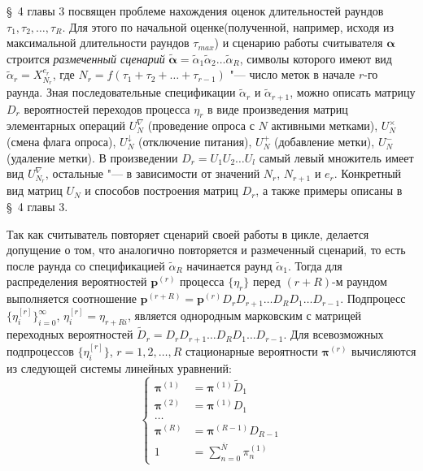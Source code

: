 \S~4 главы 3 посвящен проблеме нахождения оценок длительностей раундов $\tau_1, \tau_2, \dots, \tau_R$. Для этого по начальной оценке(полученной, например, исходя из максимальной длительности раундов $\tau_{max}$) и сценарию работы считывателя $\bm{\alpha}$ строится \textit{размеченный сценарий} $\widetilde{\bm{\alpha}} = \widetilde{\alpha}_1 \widetilde{\alpha}_2 \dots \widetilde{\alpha}_R$, символы которого имеют вид $\widetilde{\alpha}_r = X_{N_r}^{e_r}$, где $N_r = f(\tau_1 + \tau_2 + \dots + \tau_{r-1})$ "--- число меток в начале $r$-го раунда. Зная последовательные спецификации $\widetilde{\alpha}_{r}$ и $\widetilde{\alpha}_{r+1}$, можно описать матрицу $D_r$ вероятностей переходов процесса $\eta_r$ в виде произведения матриц элементарных операций $U_N^\nabla$ (проведение опроса с $N$ активными метками), $U_N^\times$ (смена флага опроса), $U_N^\downarrow$ (отключение питания), $U_N^+$ (добавление метки), $U_N^-$ (удаление метки). В произведении $D_r = U_1 U_2 \dots U_l$ самый левый множитель имеет вид $U_{N_r}^\nabla$, остальные "--- в зависимости от значений $N_r$, $N_{r+1}$ и $e_r$. Конкретный вид матриц $U_N$ и способов построения матриц $D_r$, а также примеры описаны в \S~4 главы 3.

Так как считыватель повторяет сценарий своей работы в цикле, делается допущение о том, что аналогично повторяется и размеченный сценарий, то есть после раунда со спецификацией $\widetilde{\alpha}_{R}$ начинается раунд $\widetilde{\alpha}_1$. Тогда для распределения вероятностей $\bm{p}^{(r)}$ процесса $\{ \eta_r \}$ перед $(r + R)$-м раундом выполняется соотношение $\bm{p}^{(r+R)} = \bm{p}^{(r)} D_r D_{r+1} \dots D_R D_1 \dots D_{r-1}$. Подпроцесс $\{ \eta_i^{[r]} \}_{i=0}^\infty$, $\eta_i^{[r]} = \eta_{r+Ri}$, является однородным марковским с матрицей переходных вероятностей $\widetilde{D}_r = D_r D_{r+1} \dots D_R D_1 \dots D_{r-1}$. Для всевозможных подпроцессов $\{ \eta_i^{[r]} \}$, $r = 1, 2, \dots, R$ стационарные вероятности $\bm{\pi}^{(r)}$ вычисляются из следующей системы линейных уравнений:
\begin{equation}\label{eq:bg_pmf_system}
	\begin{cases}
		\bm{\pi}^{(1)} &= \bm{\pi}^{(1)} \widetilde{D}_1\\
		\bm{\pi}^{(2)} &= \bm{\pi}^{(1)} D_1\\
		\dots&\\
		\bm{\pi}^{(R)} &= \bm{\pi}^{(R-1)} D_{R-1}\\
		1              &= \sum\limits_{n=0}^{\overline{N}} \pi^{(1)}_n
	\end{cases}
\end{equation}

